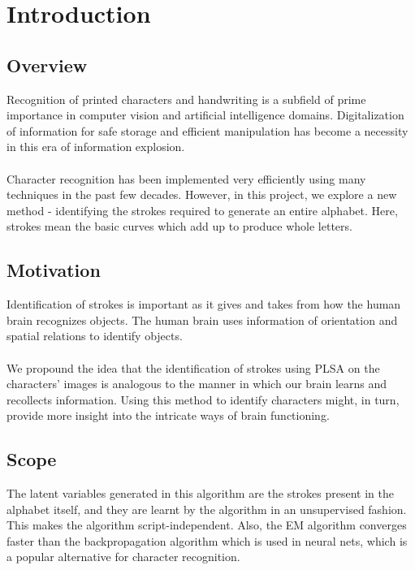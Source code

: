 \documentclass[10pt]{article}
\begin{document}
	\section{Introduction}
		\subsection{Overview}
			Recognition of printed characters and handwriting is a subfield of prime importance in computer vision and artificial intelligence domains. Digitalization of information for safe storage and efficient manipulation has become a necessity in this era of information explosion.\\\\
			Character recognition has been implemented very efficiently using many techniques in the past few decades. However, in this project, we explore a new method - identifying the strokes required to generate an entire alphabet. Here, strokes mean the basic curves which add up to produce whole letters. 
			
		\subsection{Motivation}
			Identification of strokes is important as it gives and takes from how the human brain recognizes objects. The human brain uses information of orientation and spatial relations to identify objects.\\\\
			We propound the idea that the identification of strokes using PLSA on the characters' images is analogous to the manner in which our brain learns and recollects information. Using this method to identify characters might, in turn, provide more insight into the intricate ways of brain functioning.
		\subsection{Scope}
			The latent variables generated in this algorithm are the strokes present in the alphabet itself, and they are learnt by the algorithm in an unsupervised fashion. This makes the algorithm script-independent. Also, the EM algorithm converges faster than the backpropagation algorithm  which is used in neural nets, which is a popular alternative for character recognition.
\end{document}

